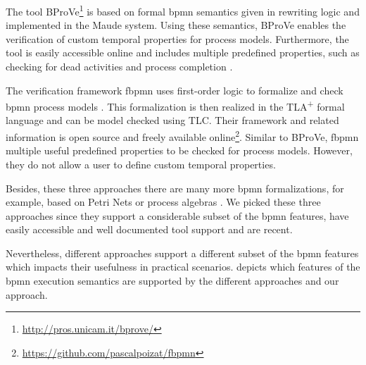 \documentclass[adraft, copyright, creativecommons]{eptcs} %
\begin{document}
The tool BProVe\footnote{\url{http://pros.unicam.it/bprove/}} is based on formal \gls*{bpmn} semantics given in rewriting logic and implemented in the Maude system.
Using these semantics, BProVe enables the verification of custom temporal properties for process models.
Furthermore, the tool is easily accessible online and includes multiple predefined properties, such as checking for dead activities and process completion \cite{corradiniFormalApproachAnalysis2021}.

The verification framework \textsf{fbpmn} uses first-order logic to formalize and check \gls*{bpmn} process models \cite{houhouFirstOrderLogicSemantics2019, houhouFirstOrderLogicVerification2022}.
This formalization is then realized in the TLA\textsuperscript{+} formal language and can be model checked using TLC.
Their framework and related information is open source and freely available online\footnote{\url{https://github.com/pascalpoizat/fbpmn}}.
Similar to BProVe, \textsf{fbpmn} multiple useful predefined properties to be checked for process models.
However, they do not allow a user to define custom temporal properties.

Besides, these three approaches there are many more \gls*{bpmn} formalizations, for example, based on Petri Nets or process algebras \cite{corradiniFormalApproachAnalysis2021, houhouFirstOrderLogicVerification2022, vangorpVisualTokenbasedFormalization2013}.
We picked these three approaches since they support a considerable subset of the \gls*{bpmn} features, have easily accessible and well documented tool support and are recent.

Nevertheless, different approaches support a different subset of the \gls*{bpmn} features which impacts their usefulness in practical scenarios.
 depicts which features of the \gls*{bpmn} execution semantics are supported by the different approaches and our approach.
\end{document}

